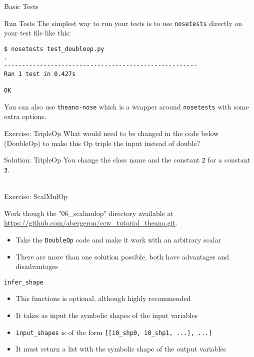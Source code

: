 \documentclass[utf8x]{beamer}
\newcommand{\code}[1]{\lstinline[emph={[2]}]|#1|}
\begin{document}
\begin{frame}{Basic Tests}

\end{frame}

\begin{frame}[fragile]{Run Tests}
The simplest way to run your tests is to use \texttt{nosetests} directly on your test file like this:

\begin{lstlisting}[language={},backgroundcolor=\color{white},frame={}]
$ nosetests test_doubleop.py
.
------------------------------------------------------
Ran 1 test in 0.427s

OK
\end{lstlisting}

You can also use \texttt{theano-nose} which is a wrapper around \texttt{nosetests} with some extra options.

\end{frame}

\begin{frame}{Exercise: TripleOp}
What would need to be changed in the code below (DoubleOp) to make this Op triple the input instead of double?

\end{frame}

\begin{frame}{Solution: TripleOp}
You change the class name and the constant \code{2} for a constant \code{3}. \\
\ 

\end{frame}

\begin{frame}{Exercise: ScalMulOp}
\begin{center}
Work though the "06\_scalmulop" directory available at \url{https://github.com/abergeron/ccw_tutorial_theano.git}.
\end{center}
\begin{itemize}
\item Take the \code{DoubleOp} code and make it work with an arbitrary scalar
\item There are more than one solution possible, both have advantages and disadvantages
\end{itemize}
\end{frame}

\begin{frame}{\code{infer_shape}}

\begin{itemize}
\item This functions is optional, although highly recommended
\item It takes as input the symbolic shapes of the input variables
\item \code{input_shapes} is of the form \code{[[i0_shp0, i0_shp1, ...], ...]}
\item It must return a list with the symbolic shape of the output variables
\end{itemize}
\end{frame}
\end{document}
